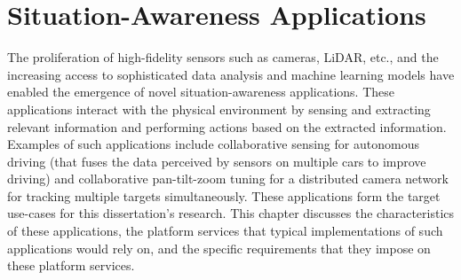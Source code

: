 \chapter{Situation-Awareness Applications}
\label{sec:apps}
The proliferation of high-fidelity sensors such as cameras, LiDAR, etc., and the increasing access to sophisticated data analysis and machine learning models have enabled the emergence of novel situation-awareness applications. These applications interact with the physical environment by sensing and extracting relevant information and performing actions based on the extracted information. Examples of such applications include collaborative sensing for autonomous driving (that fuses the data perceived by sensors on multiple cars to improve driving) and collaborative pan-tilt-zoom tuning for a distributed camera network for tracking multiple targets simultaneously. These applications form the target use-cases for this dissertation's research. This chapter discusses the characteristics of these applications, the platform services that typical implementations of such applications would rely on, and the specific requirements that they impose on these platform services.

